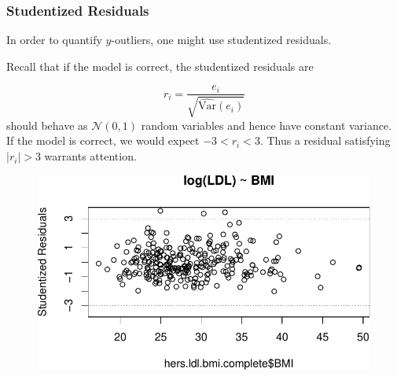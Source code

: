 \documentclass[
  letterpaper,
  DIV=11,
  numbers=noendperiod]{scrreport}
\newenvironment{Shaded}{\begin{snugshade}}{\end{snugshade}}
\newcommand{\AttributeTok}[1]{\textcolor[rgb]{0.40,0.45,0.13}{#1}}
\newcommand{\DecValTok}[1]{\textcolor[rgb]{0.68,0.00,0.00}{#1}}
\newcommand{\FloatTok}[1]{\textcolor[rgb]{0.68,0.00,0.00}{#1}}
\newcommand{\FunctionTok}[1]{\textcolor[rgb]{0.28,0.35,0.67}{#1}}
\newcommand{\NormalTok}[1]{\textcolor[rgb]{0.00,0.23,0.31}{#1}}
\newcommand{\OtherTok}[1]{\textcolor[rgb]{0.00,0.23,0.31}{#1}}
\newcommand{\SpecialCharTok}[1]{\textcolor[rgb]{0.37,0.37,0.37}{#1}}
\newcommand{\StringTok}[1]{\textcolor[rgb]{0.13,0.47,0.30}{#1}}
\begin{document}
\hypertarget{studentized-residuals-1}{%
\subsubsection{Studentized Residuals}\label{studentized-residuals-1}}

In order to quantify \(y\)-outliers, one might use studentized
residuals.

Recall that if the model is correct, the studentized residuals are

\[r_i = \frac{e_i}{\sqrt{\widehat{\text{Var}} (e_i) }}\] should behave
as \(\mathcal N(0,1)\) random variables and hence have constant
variance. If the model is correct, we would expect \(-3 < r_i < 3\).
Thus a residual satisfying \(|r_i| > 3\) warrants attention.

\begin{Shaded}
\end{Shaded}

\begin{figure}[H]

{\centering \includegraphics{week4/week4_files/figure-pdf/unnamed-chunk-12-1.pdf}

}

\end{figure}
\end{document}
